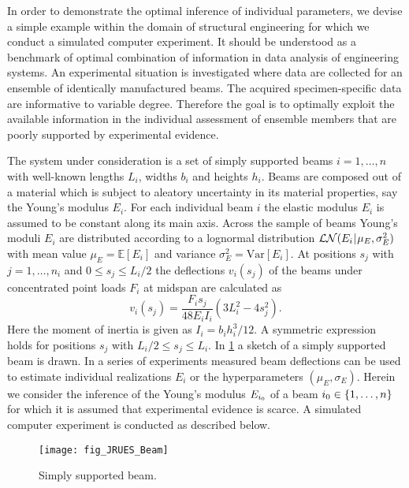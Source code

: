 In order to demonstrate the optimal inference of individual parameters, we devise a simple example within the domain of structural engineering for which we conduct a simulated computer experiment.
It should be understood as a benchmark of optimal combination of information in data analysis of engineering systems.
An experimental situation is investigated where data are collected for an ensemble of identically manufactured beams.
The acquired specimen-specific data are informative to variable degree.
Therefore the goal is to optimally exploit the available information in the individual assessment of ensemble members that are poorly supported by experimental evidence.
\par %
The system under consideration is a set of simply supported beams \(i=1,\ldots,n\) with well-known lengths \(L_i\), widths \(b_i\) and heights \(h_i\).
Beams are composed out of a material which is subject to aleatory uncertainty in its material properties, say the Young's modulus \(E_i\). 
For each individual beam \(i\) the elastic modulus \(E_i\) is assumed to be constant along its main axis.
Across the sample of beams Young's moduli \(E_i\) are distributed according to a lognormal distribution \(\mathcal{LN}(E_i {\:\!}|{\:\!} \mu_E,\sigma_E^2)\)
with mean value \(\mu_E = \mathds{E}[E_i]\) and variance \(\sigma_E^2 = \mathrm{Var}[E_i]\).
At positions \(s_j\) with \(j=1,\ldots,n_i\) and \(0 \leq s_j \leq L_i/2\) the deflections \(v_i(s_j)\) of the beams under concentrated point loads \(F_i\) at midspan are calculated as
\begin{equation} \label{eq:ForwardModel}
  v_i(s_j) = \frac{F_i s_j }{48 E_i I_i} \left( 3 L_i^2 - 4s_j^2 \right).
\end{equation}
Here the moment of inertia is given as \(I_i = b_i h_i^3 / 12\).
A symmetric expression holds for positions \(s_j\) with \(L_i/2 \leq s_j \leq L_i\).
In \cref{fig:Beam} a sketch of a simply supported beam is drawn.
In a series of experiments measured beam deflections can be used to estimate individual realizations \(E_i\) or the hyperparameters \((\mu_E,\sigma_E)\).
Herein we consider the inference of the Young's modulus \(E_{i_0}\) of a beam \(i_0 \in \{1,\ldots,n\}\) for which it is assumed that experimental evidence is scarce.
A simulated computer experiment is conducted as described below.
\begin{figure}[ht]
  \centering
  \texttt{[image: fig\_JRUES\_Beam]}
  \caption[Simply supported beam]{Simply supported beam.}
  \label{fig:Beam}
\end{figure}
